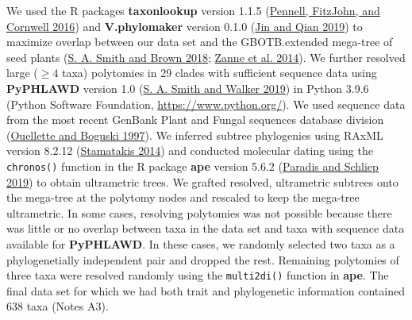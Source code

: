 \documentclass[
  12pt,
]{article}
\begin{document}
We used the R packages \textbf{taxonlookup} version 1.1.5 (\protect\hyperlink{ref-pennell_simple_2016}{Pennell, FitzJohn, and Cornwell 2016}) and \textbf{V.phylomaker} version 0.1.0 (\protect\hyperlink{ref-jin_vphylomaker_2019}{Jin and Qian 2019}) to maximize overlap between our data set and the GBOTB.extended mega-tree of seed plants (\protect\hyperlink{ref-smith_constructing_2018}{S. A. Smith and Brown 2018}; \protect\hyperlink{ref-zanne_three_2014}{Zanne et al. 2014}). We further resolved large (\(\ge4\) taxa) polytomies in 29 clades with sufficient sequence data using \textbf{PyPHLAWD} version 1.0 (\protect\hyperlink{ref-smith_pyphlawd_2019}{S. A. Smith and Walker 2019}) in Python 3.9.6 (Python Software Foundation, \url{https://www.python.org/}). We used sequence data from the most recent GenBank Plant and Fungal sequences database division (\protect\hyperlink{ref-ouellette_database_1997}{Ouellette and Boguski 1997}). We inferred subtree phylogenies using RAxML version 8.2.12 (\protect\hyperlink{ref-stamatakis_raxml_2014}{Stamatakis 2014}) and conducted molecular dating using the \texttt{chronos()} function in the R package \textbf{ape} version 5.6.2 (\protect\hyperlink{ref-paradis_ape_2019}{Paradis and Schliep 2019}) to obtain ultrametric trees. We grafted resolved, ultrametric subtrees onto the mega-tree at the polytomy nodes and rescaled to keep the mega-tree ultrametric. In some cases, resolving polytomies was not possible because there was little or no overlap between taxa in the data set and taxa with sequence data available for \textbf{PyPHLAWD}. In these cases, we randomly selected two taxa as a phylogenetially independent pair and dropped the rest. Remaining polytomies of three taxa were resolved randomly using the \texttt{multi2di()} function in \textbf{ape}. The final data set for which we had both trait and phylogenetic information contained 638 taxa (Notes A3).

\clearpage
\end{document}

